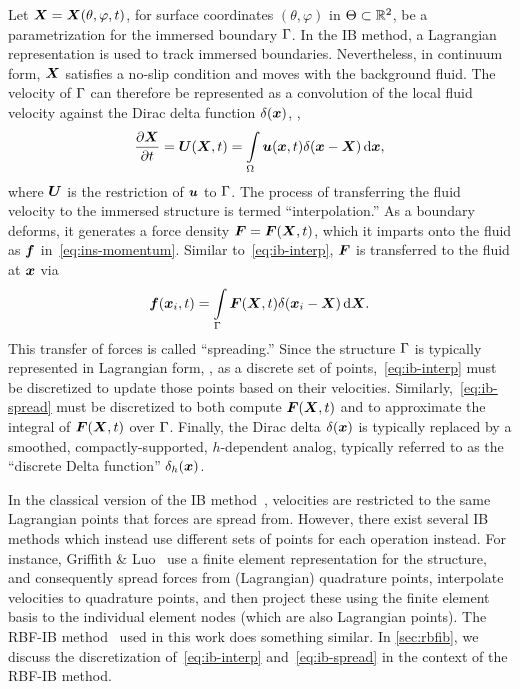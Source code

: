 Let $\boldsymbol{X} = \boldsymbol{X}(\theta, \varphi, t)$, for surface coordinates $(\theta, \varphi)$ in $\Theta\subset\mathbb{R}^2$, be a
parametrization for the immersed boundary $\Gamma$. In the IB method, a Lagrangian representation is used to
track immersed boundaries.  Nevertheless, in continuum form, $\boldsymbol{X}$ satisfies a no-slip condition and moves with the
background fluid. The velocity of $\Gamma$ can therefore be represented as a convolution of the local fluid
velocity against the Dirac delta function $\delta(\boldsymbol{x})$, ,
\begin{equation}\label{eq:ib-interp}
    \frac{\partial \X}{\partial t} = \U(\X, t) %
        = \int\limits_{\domain} \u(\x, t) \Dirac(\x-\X) \d\x,
\end{equation}
where $\boldsymbol{U}$ is the restriction of $\boldsymbol{u}$ to $\Gamma$.
The process of transferring the fluid velocity to the immersed structure is termed ``interpolation\qend.'' %
As a boundary deforms, it generates a force density $\boldsymbol{F} = \boldsymbol{F}(\boldsymbol{X}, t)$, which it imparts onto
the fluid as $\boldsymbol{f}$ in~\eqref{eq:ins-momentum}. Similar to~\eqref{eq:ib-interp}, $\boldsymbol{F}$ is transferred to the fluid at
$\boldsymbol{x}$ via
\begin{equation}\label{eq:ib-spread}
        \f(\x_i, t)
        = \int\limits_{\interface} \F(\X, t)\Dirac(\x_i-\X) \d\X.
\end{equation}
This transfer of forces is called ``spreading\qend.'' Since the structure $\Gamma$ is typically represented in
Lagrangian form, , as a discrete set of points,~\eqref{eq:ib-interp} must be discretized to update
those points based on their velocities. Similarly,~\eqref{eq:ib-spread} must be discretized to both compute
$\boldsymbol{F}(\boldsymbol{X}, t)$ and to approximate the integral of $\boldsymbol{F}(\boldsymbol{X}, t)$ over $\Gamma$. Finally, the Dirac delta
$\delta(\boldsymbol{x})$ is typically replaced by a smoothed, compactly-supported, $h$-dependent analog, typically referred to
as the ``discrete Delta function'' $\delta_h(\boldsymbol{x})$.

In the classical version of the IB method~\cite{Peskin:2002go}, velocities are restricted to the same Lagrangian
points that forces are spread from.  However, there exist several IB methods which instead use different sets of
points for each operation instead. For instance, Griffith \& Luo~\cite{Griffith:2017id} use a finite element
representation for the structure, and consequently spread forces from (Lagrangian) quadrature points, interpolate
velocities to quadrature points, and then project these using the finite element basis to the individual element
nodes (which are also Lagrangian points). The RBF-IB method~\cite{Shankar:2015km} used in this work does something
similar. In \cref{sec:rbfib}, we discuss the discretization of~\eqref{eq:ib-interp} and~\eqref{eq:ib-spread} in
the context of the RBF-IB method.

